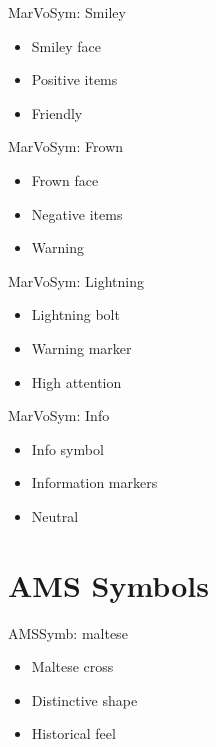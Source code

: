 \documentclass[12pt]{beamer}
\begin{document}
\begin{frame}{MarVoSym: Smiley}
\begin{itemize}
  \item Smiley face
  \item Positive items
  \item Friendly
\end{itemize}
\end{frame}

\begin{frame}{MarVoSym: Frown}
\begin{itemize}
  \item Frown face
  \item Negative items
  \item Warning
\end{itemize}
\end{frame}

\begin{frame}{MarVoSym: Lightning}
\begin{itemize}
  \item Lightning bolt
  \item Warning marker
  \item High attention
\end{itemize}
\end{frame}

\begin{frame}{MarVoSym: Info}
\begin{itemize}
  \item Info symbol
  \item Information markers
  \item Neutral
\end{itemize}
\end{frame}

\section{AMS Symbols}

\begin{frame}{AMSSymb: maltese}
\begin{itemize}
  \item Maltese cross
  \item Distinctive shape
  \item Historical feel
\end{itemize}
\end{frame}
\end{document}
